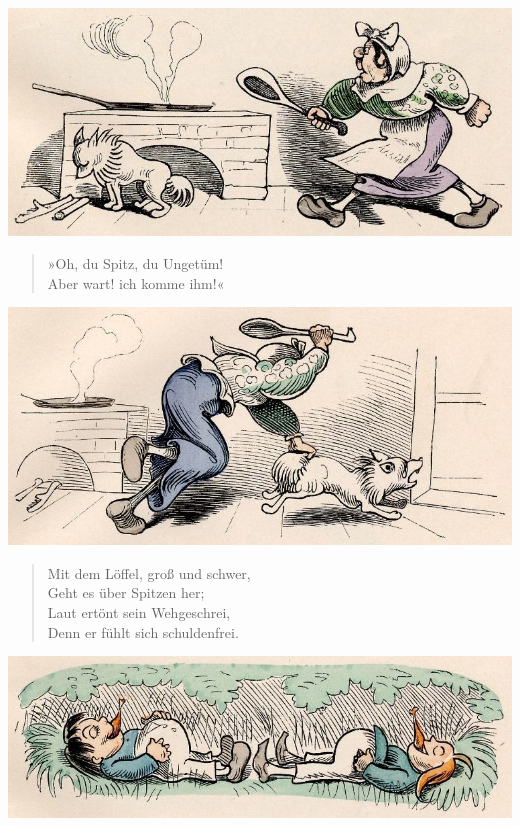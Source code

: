 \documentclass[a4paper,12pt]{article}
\begin{document}
\begin{center}\includegraphics[scale=.7, alt={Spitz?}]{images/2-08.jpg}\end{center}



\begin{verse}
»Oh, du Spitz, du Ungetüm!\\{}
Aber wart! ich komme ihm!«
\end{verse}



\begin{center}\includegraphics[scale=.7, alt={Spitz!}]{images/2-09.jpg}\end{center}



\begin{verse}
Mit dem Löffel, groß und schwer,\\{}
Geht es über Spitzen her;\\{}
Laut ertönt sein Wehgeschrei,\\{}
Denn er fühlt sich schuldenfrei.
\end{verse}



\begin{center}\includegraphics[scale=.7, alt={Max und Moritz im Verstecke}]{images/2-10.jpg}\end{center}
\end{document}
